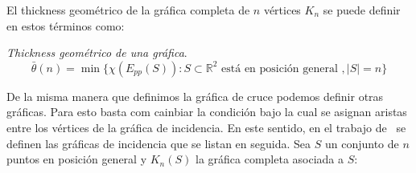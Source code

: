 

El thickness geométrico de la gráfica completa de $n$ vértices $K_n$ se puede
definir en estos términos como:
\begin{definition}{\emph{Thickness geométrico de una gráfica}.}
  \[\bar{\theta}(n) = \min\{ \chi(E_{pp}(S)): S \subset \mathbb{R}^2 \text{ está en posición general }, |S|=n \}\]
\end{definition}
%

De la misma manera que definimos la gráfica de cruce podemos definir otras
gráficas. Para esto basta com cainbiar la condición bajo la cual se asignan
aristas entre los vértices de la gráfica de incidencia. En este sentido, en el
trabajo de~\cite{Araujo2005} se definen las gráficas de incidencia que se listan
en seguida. Sea $S$ un conjunto de $n$ puntos en posición general y $K_n(S)$
la gráfica completa asociada a $S$:

